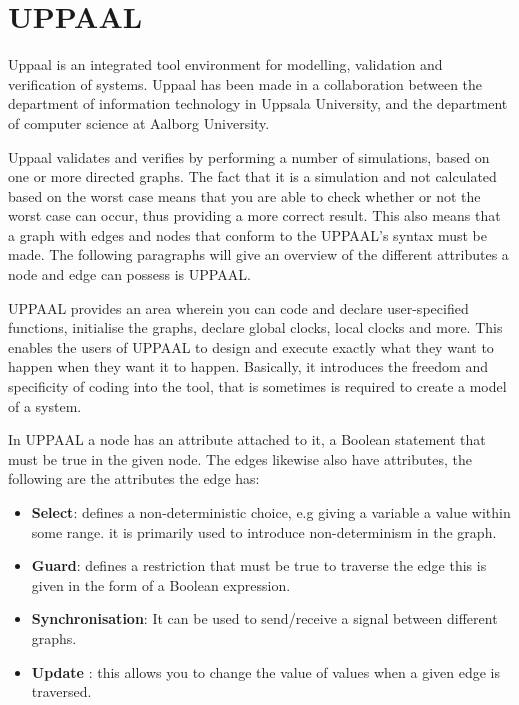 \section{UPPAAL}\label{UPPAALTheory}

Uppaal is an integrated tool environment for modelling, validation and verification of systems. Uppaal has been made in a collaboration between the department of information technology in Uppsala University, and the department of computer science at Aalborg University.

Uppaal validates and verifies by performing a number of simulations, based on one or more directed graphs. The fact that it is a simulation and not calculated based on the worst case means that you are able to check whether or not the worst case can occur, thus providing a more correct result. This also means that a graph with edges and nodes that conform to the UPPAAL's syntax must be made. The following paragraphs will give an overview of the different attributes a node and edge can possess is UPPAAL.

UPPAAL provides an area wherein you can code and declare user-specified functions, initialise the graphs, declare global clocks, local clocks and more. This enables the users of UPPAAL to design and execute exactly what they want to happen when they want it to happen. Basically, it introduces the freedom and specificity of coding into the tool, that is sometimes is required to create a model of a system. 

In UPPAAL a node has an attribute attached to it, a Boolean statement that must be true in the given node. The edges likewise also have attributes, the following are the attributes the edge has:
\begin{itemize}
\item{\textbf{Select}}: defines a non-deterministic choice, e.g giving a variable a value within some range. it is primarily used to introduce non-determinism in the graph. 
\item{\textbf{Guard}}: defines a restriction that must be true to traverse the edge this is given in the form of a Boolean expression. 
\item{\textbf{Synchronisation}}: It can be used to send/receive a signal between different graphs.
\item{\textbf{Update}} : this allows you to change the value of values when a given edge is traversed.
\end{itemize}

